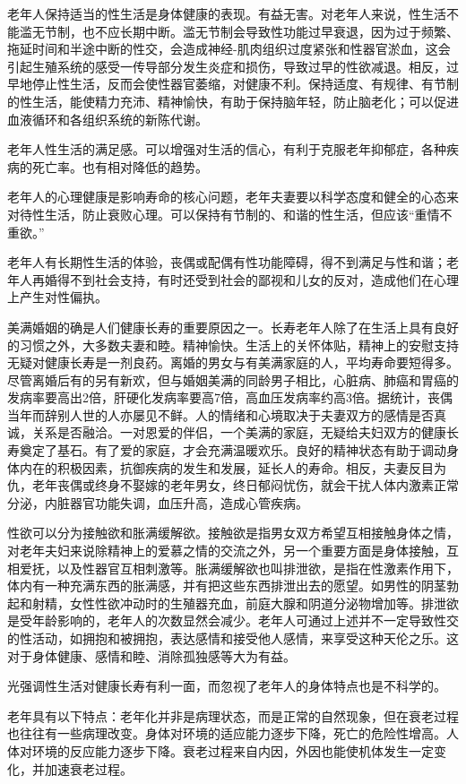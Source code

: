 \documentclass[12pt,UTF8,openany]{ctexbook}
\begin{document}
老年人保持适当的性生活是身体健康的表现。有益无害。对老年人来说，性生活不能滥无节制，也不应长期中断。滥无节制会导致性功能过早衰退，因为过于频繁、拖延时间和半途中断的性交，会造成神经-肌肉组织过度紧张和性器官淤血，这会引起生殖系统的感受一传导部分发生炎症和损伤，导致过早的性欲减退。相反，过早地停止性生活，反而会使性器官萎缩，对健康不利。保持适度、有规律、有节制的性生活，能使精力充沛、精神愉快，有助于保持脑年轻，防止脑老化；可以促进血液循环和各组织系统的新陈代谢。

老年人性生活的满足感。可以增强对生活的信心，有利于克服老年抑郁症，各种疾病的死亡率。也有相对降低的趋势。

老年人的心理健康是影响寿命的核心问题，老年夫妻要以科学态度和健全的心态来对待性生活，防止衰败心理。可以保持有节制的、和谐的性生活，但应该“重情不重欲。”

老年人有长期性生活的体验，丧偶或配偶有性功能障碍，得不到满足与性和谐；老年人再婚得不到社会支持，有时还受到社会的鄙视和儿女的反对，造成他们在心理上产生对性偏执。

美满婚姻的确是人们健康长寿的重要原因之一。长寿老年人除了在生活上具有良好的习惯之外，大多数夫妻和睦。精神愉快。生活上的关怀体贴，精神上的安慰支持无疑对健康长寿是一剂良药。离婚的男女与有美满家庭的人，平均寿命要短得多。尽管离婚后有的另有新欢，但与婚姻美满的同龄男子相比，心脏病、肺癌和胃癌的发病率要高出2倍，肝硬化发病率要高7倍，高血压发病率约高3倍。据统计，丧偶当年而辞别人世的人亦屡见不鲜。人的情绪和心境取决于夫妻双方的感情是否真诚，关系是否融洽。一对恩爱的伴侣，一个美满的家庭，无疑给夫妇双方的健康长寿奠定了基石。有了爱的家庭，才会充满温暖欢乐。良好的精神状态有助于调动身体内在的积极因素，抗御疾病的发生和发展，延长人的寿命。相反，夫妻反目为仇，老年丧偶或终身不娶嫁的老年男女，终日郁闷忧伤，就会干扰人体内激素正常分泌，内脏器官功能失调，血压升高，造成心管疾病。

性欲可以分为接触欲和胀满缓解欲。接触欲是指男女双方希望互相接触身体之情，对老年夫妇来说除精神上的爱慕之情的交流之外，另一个重要方面是身体接触，互相爱抚，以及性器官互相刺激等。胀满缓解欲也叫排泄欲，是指在性激素作用下，体内有一种充满东西的胀满感，并有把这些东西排泄出去的愿望。如男性的阴茎勃起和射精，女性性欲冲动时的生殖器充血，前庭大腺和阴道分泌物增加等。排泄欲是受年龄影响的，老年人的次数显然会减少。老年人可通过上述并不一定导致性交的性活动，如拥抱和被拥抱，表达感情和接受他人感情，来享受这种天伦之乐。这对于身体健康、感情和睦、消除孤独感等大为有益。

光强调性生活对健康长寿有利一面，而忽视了老年人的身体特点也是不科学的。

老年具有以下特点：老年化并非是病理状态，而是正常的自然现象，但在衰老过程也往往有一些病理改变。身体对环境的适应能力逐步下降，死亡的危险性增高。人体对环境的反应能力逐步下降。衰老过程来自内因，外因也能使机体发生一定变化，并加速衰老过程。
\end{document}
